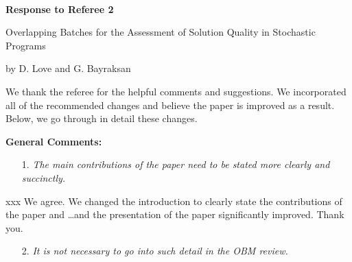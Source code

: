 \documentclass[11pt,notitlepage,onecolumn]{article}
\newcommand{\noi}{\noindent}
\begin{document}

\singlespacing

\baselineskip0.26in


\pagebreak

\
\begin{center}
\textbf{\Large Response to Referee 2} 
\medskip

{\large Overlapping Batches for the Assessment of Solution Quality in Stochastic Programs}
\medskip

{\footnotesize by D. Love and G. Bayraksan}
\end{center}

\bigskip



We thank the referee for the helpful comments and suggestions. 
We incorporated all of the recommended changes and believe the paper is improved as a result. 
Below, we go through in detail these changes. 
\medskip

\bigskip 


\noi  
{\large \bf General Comments:}
\medskip 


\begin{itemize}
\item[1.] \textit{The main contributions of the paper need to be stated more clearly and succinctly.}
\end{itemize}

\noindent 
xxx  We agree. 
We changed the introduction to clearly state the contributions of the paper and \ldots  and the presentation of the paper significantly improved.  Thank you.
\medskip 


\begin{itemize}
\item[2.] \textit{It is not necessary to go into such detail in the OBM review.}
\end{itemize}

\smallskip 
\end{document}
